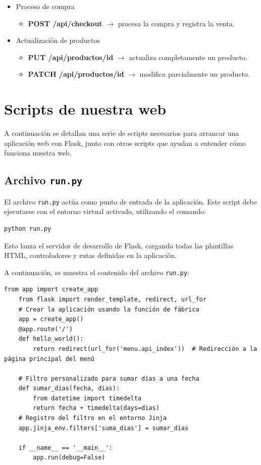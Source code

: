 \documentclass[10pt]{book}
\begin{document}
\begin{itemize}
\begin{itemize}
            \end{itemize}
            \item Proceso de compra
            \begin{itemize}
                \item \textbf{POST /api/checkout} $\rightarrow$ procesa la compra y registra la venta.
            \end{itemize}
            \item Actualización de productos
            \begin{itemize}
                \item \textbf{PUT /api/productos/{id}} $\rightarrow$ actualiza completamente un producto.
                \item \textbf{PATCH /api/productos/{id}} $\rightarrow$ modifica parcialmente un producto.
            \end{itemize}
        \end{itemize}
        
\section{Scripts de nuestra web}
A continuación se detallan una serie de scripts necesarios para arrancar una aplicación web con Flask, junto con otros scripts que ayudan a entender cómo funciona nuestra web.
\subsection{Archivo \texttt{run.py}}

    El archivo \texttt{run.py} actúa como punto de entrada de la aplicación. Este script debe ejecutarse con el entorno virtual activado, utilizando el comando:
    
    \begin{lstlisting}[style=simplebash]
    python run.py
    \end{lstlisting}
    
    Esto lanza el servidor de desarrollo de Flask, cargando todas las plantillas HTML, controladores y rutas definidas en la aplicación.
    
    A continuación, se muestra el contenido del archivo \texttt{run.py}:
    
    \begin{lstlisting}[style=pythonclean, caption={Script principal \texttt{run.py}}]
    from app import create_app
    from flask import render_template, redirect, url_for
    # Crear la aplicación usando la función de fábrica
    app = create_app()
    @app.route('/')
    def hello_world():
        return redirect(url_for('menu.api_index'))  # Redirección a la página principal del menú

    # Filtro personalizado para sumar días a una fecha
    def sumar_dias(fecha, dias):
        from datetime import timedelta
        return fecha + timedelta(days=dias)
    # Registro del filtro en el entorno Jinja
    app.jinja_env.filters['suma_dias'] = sumar_dias

    if __name__ == '__main__':
        app.run(debug=False)
    \end{lstlisting}
    
\end{document}
